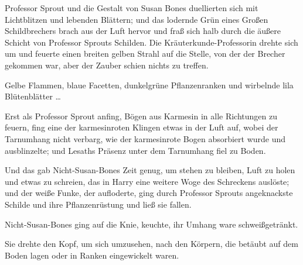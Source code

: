 Professor Sprout und die Gestalt von Susan Bones duellierten sich mit Lichtblitzen und lebenden Blättern; und das lodernde Grün eines Großen Schildbrechers brach aus der Luft hervor und fraß sich halb durch die äußere Schicht von Professor Sprouts Schilden. Die Kräuterkunde-Professorin drehte sich um und feuerte einen breiten gelben Strahl auf die Stelle, von der der Brecher gekommen war, aber der Zauber schien nichts zu treffen.

Gelbe Flammen, blaue Facetten, dunkelgrüne Pflanzenranken und wirbelnde lila Blütenblätter …

Erst als Professor Sprout anfing, Bögen aus Karmesin in alle Richtungen zu feuern, fing eine der karmesinroten Klingen etwas in der Luft auf, wobei der Tarnumhang nicht verbarg, wie der karmesinrote Bogen absorbiert wurde und ausblinzelte; und Lesaths Präsenz unter dem Tarnumhang fiel zu Boden.

Und das gab Nicht-Susan-Bones Zeit genug, um stehen zu bleiben, Luft zu holen und etwas zu schreien, das in Harry eine weitere Woge des Schreckens auslöste; und der weiße Funke, der aufloderte, ging durch Professor Sprouts angeknackste Schilde und ihre Pflanzenrüstung und ließ sie fallen.

Nicht-Susan-Bones ging auf die Knie, keuchte, ihr Umhang ware schweißgetränkt.

Sie drehte den Kopf, um sich umzusehen, nach den Körpern, die betäubt auf dem Boden lagen oder in Ranken eingewickelt waren.

